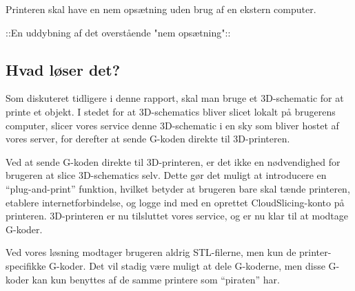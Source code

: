 Printeren skal have en nem opsætning uden brug af en ekstern computer.

::En uddybning af det overstående "nem opsætning"::

\subsection{Hvad løser det?} %
\label{sub:hvad_l_ser_det_}

Som diskuteret tidligere i denne rapport, skal man bruge et 3D-schematic for at printe et objekt. I stedet for at 3D-schematics bliver slicet lokalt på brugerens computer, slicer vores service denne 3D-schematic i en sky som bliver hostet af vores server, for derefter at sende G-koden direkte til 3D-printeren. 

Ved at sende G-koden direkte til 3D-printeren, er det ikke en nødvendighed for brugeren at slice 3D-schematics selv. Dette gør det muligt at introducere en ``plug-and-print'' funktion, hvilket betyder at brugeren bare skal tænde printeren, etablere internetforbindelse, og logge ind med en oprettet CloudSlicing-konto på printeren. 3D-printeren er nu tilsluttet vores service, og er nu klar til at modtage G-koder.

Ved vores løsning modtager brugeren aldrig STL-filerne, men kun de printer-specifikke G-koder. Det vil stadig være muligt at dele G-koderne, men disse G-koder kan kun benyttes af de samme printere som ``piraten'' har.





